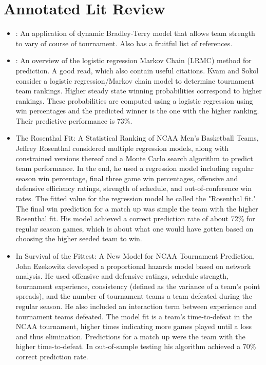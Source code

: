 \section*{Annotated Lit Review}
\begin{itemize}
\item \cite{cattelan2013}: An application of dynamic Bradley-Terry model that allows team strength to vary of course of tournament.  Also has a fruitful list of references.
\item \cite{Kvam2006}: An overview of the logistic regression Markov Chain (LRMC) method for prediction.  A good read, which also contain useful citations. Kvam and Sokol consider a logistic regression/Markov chain model to determine tournament team rankings. Higher steady state winning probabilities correspond to higher rankings. These probabilities are computed using a logistic regression using win percentages and the predicted winner is the one with the higher ranking. Their predictive performance is 73\%.
\item The Rosenthal Fit: A Statistical Ranking of NCAA Men’s Basketball Teams, Jeffrey Rosenthal considered multiple regression models, along with constrained versions thereof and a Monte Carlo search algorithm to predict team performance. In the end, he used a regression model including regular season win percentage, final three game win percentages, offensive and defensive efficiency ratings, strength of schedule, and out-of-conference win rates. The fitted value for the regression model he called the "Rosenthal fit." The final win prediction for a match up was simple the team with the higher Rosenthal fit. His model achieved a correct prediction rate of about 72\% for regular season games, which is about what one would have gotten based on choosing the higher seeded team to win.
\item In Survival of the Fittest: A New Model for NCAA Tournament Prediction, John Ezekowitz developed a proportional hazards model based on network analysis. He used offensive and defensive ratings, schedule strength, tournament experience, consistency (defined as the variance of a team's point spreads), and the number of tournament teams a team defeated during the regular season. He also included an interaction term between experience and tournament teams defeated. The model fit is a team's time-to-defeat in the NCAA tournament, higher times indicating more games played until a loss and thus elimination. Predictions for a match up were the team with the higher time-to-defeat. In out-of-sample testing his algorithm achieved a 70\% correct prediction rate.
\end{itemize}
\newpage
